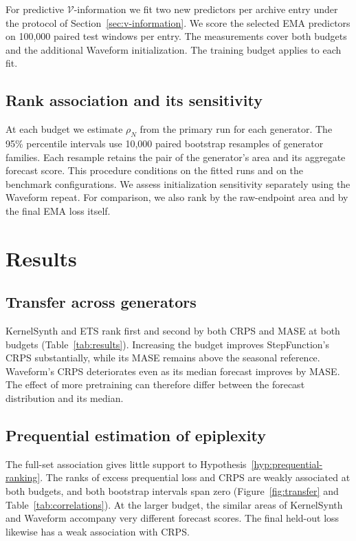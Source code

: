 \documentclass[10pt,a4paper]{article}
\theoremstyle{definition}
\begin{document}
For predictive $\mathcal V$-information we fit two new predictors per
archive entry under the protocol of Section~\ref{sec:v-information}.
We score the selected EMA predictors on 100,000 paired test windows per
entry. The measurements cover both budgets and the additional Waveform
initialization. The training budget applies to each fit.

\subsection{Rank association and its sensitivity}
At each budget we estimate $\rho_N$ from the primary run for each
generator. The 95\% percentile intervals use 10,000 paired bootstrap
resamples of generator families. Each resample retains the pair of
the generator's area and its aggregate forecast score. This procedure
conditions on the fitted runs and on the benchmark configurations.
We assess initialization sensitivity separately using the Waveform
repeat. For comparison, we also rank by the raw-endpoint area and by
the final EMA loss itself.

\section{Results}\label{sec:results}

\subsection{Transfer across generators}
KernelSynth and ETS rank first and second by both CRPS and MASE at
both budgets (Table~\ref{tab:results}). Increasing the budget improves
StepFunction's CRPS substantially, while its MASE remains above the
seasonal reference. Waveform's CRPS deteriorates even as its median
forecast improves by MASE. The effect of more pretraining can therefore
differ between the forecast distribution and its median.

\begin{table}[htbp]
\centering\small
\caption{Excess prequential loss $A_N$ in million nats and aggregate forecast
error ratios relative to the seasonal na\"ive forecast. Lower error ratios
indicate better transfer. Bold marks the best primary score for each
metric and budget. Primary runs share initialization seed 0.}
\label{tab:results}

\end{table}

\subsection{Prequential estimation of epiplexity}
The full-set association gives little support to
Hypothesis~\ref{hyp:prequential-ranking}. The ranks of excess prequential
loss and CRPS are weakly associated at both budgets, and both bootstrap
intervals span zero (Figure~\ref{fig:transfer} and
Table~\ref{tab:correlations}). At the larger budget, the similar areas
of KernelSynth and Waveform accompany very different forecast scores.
The final held-out loss likewise has a weak association with CRPS.
\end{document}

